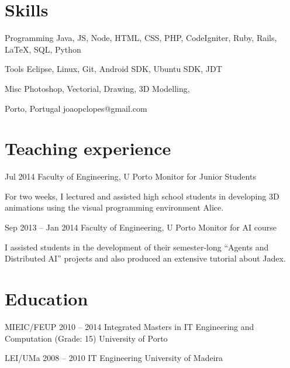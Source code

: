 \documentclass{tccv}
\begin{document}
\section{Skills}
\begin{factlist}
\item{Programming}
    {Java, JS, Node, HTML, CSS, PHP, CodeIgniter, Ruby, Rails, \LaTeX, SQL, Python
}
\item{Tools}
    {Eclipse, Linux, Git, Android SDK, Ubuntu SDK, JDT}

\item{Misc}
    {Photoshop, Vectorial, Drawing, 3D Modelling, }

\end{factlist}

    {Porto, Portugal}
    {joaopclopes@gmail.com}

\section{Teaching experience}

\begin{eventlist}

\item{Jul 2014}
    {Faculty of Engineering, U Porto}
    {Monitor for Junior Students}

For two weeks, I lectured and assisted high school students in developing 3D animations using the visual programming environment Alice.

\item{Sep 2013 -- Jan 2014}
    {Faculty of Engineering, U Porto}
    {Monitor for AI course}

I assisted students in the development of their semester-long ``Agents and Distributed AI'' projects and also produced an extensive tutorial about Jadex.

\end{eventlist}



\section{Education}

\begin{yearlist}

\item[MIEIC/FEUP]{2010 -- 2014}
    {Integrated Masters in IT Engineering and Computation}
    {(Grade: 15)
    \newline University of Porto}

\item[LEI/UMa]{2008 -- 2010}
    {IT Engineering}
    {University of Madeira}
\end{yearlist}
\end{document}
